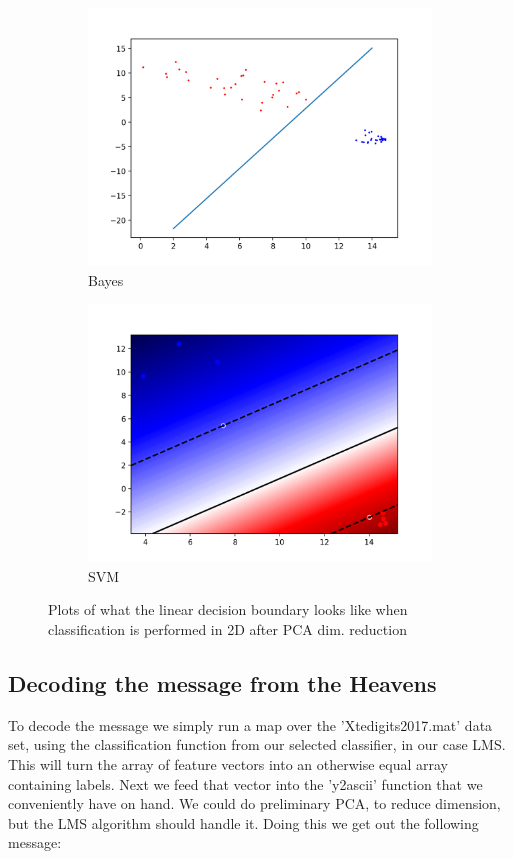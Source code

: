 \documentclass[12pt, a4paper]{article}
\begin{document}
\begin{figure}[H]
\begin{subfigure}{0.45\textwidth}
        \includegraphics[width=\textwidth]{recursos/3/bayes_small}
        \caption{Bayes}
    \end{subfigure}
    \begin{subfigure}{0.45\textwidth}
        \includegraphics[width=\textwidth]{recursos/3/svm_small}
        \caption{SVM}
    \end{subfigure}
     \caption{Plots of what the linear decision boundary looks like when classification is performed in 2D after PCA dim. reduction }
\end{figure}




\subsection{Decoding the message from the Heavens}
To decode the message we simply run a map over the 'Xte\textunderscore digits\textunderscore 2017.mat' data set, using the classification function from our selected classifier, in our case LMS. This will turn the array of feature vectors into an otherwise equal array containing labels. Next we feed that vector into the 'y2ascii' function that we conveniently have on hand. We could do preliminary PCA, to reduce dimension, but the LMS algorithm should handle it. Doing this we get out the following message:
\end{document}

